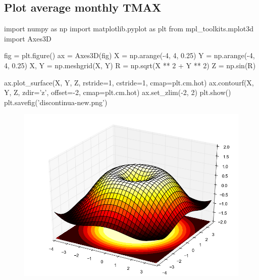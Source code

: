 \documentclass[12pt,a4paper]{scrartcl}
\begin{document}
\subsection*{Plot average monthly TMAX}
\begin{pyblock}[plot]
import numpy as np
import matplotlib.pyplot as plt
from mpl_toolkits.mplot3d import Axes3D

fig = plt.figure()
ax = Axes3D(fig)
X = np.arange(-4, 4, 0.25)
Y = np.arange(-4, 4, 0.25)
X, Y = np.meshgrid(X, Y)
R = np.sqrt(X ** 2 + Y ** 2)
Z = np.sin(R)

ax.plot_surface(X, Y, Z, rstride=1, cstride=1, cmap=plt.cm.hot)
ax.contourf(X, Y, Z, zdir='z', offset=-2, cmap=plt.cm.hot)
ax.set_zlim(-2, 2)
plt.show()
plt.savefig('discontinua-new.png')
\end{pyblock}
\begin{figure}[H]
\includegraphics[scale=0.5]{figure_1.png} 
\end{figure}
\end{document}
